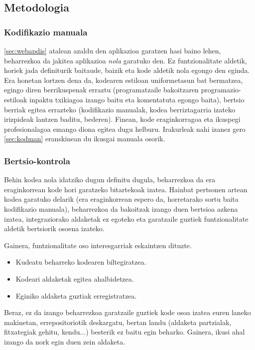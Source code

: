 \subsection{Metodologia}
\subsubsection{Kodifikazio manuala}
\ref{sec:webapdis} atalean azaldu den aplikazioa garatzen hasi baino lehen, beharrezkoa da jakitea aplikazioa \textit{nola} garatuko den. Ez funtzionalitate aldetik, horiek jada definiturik baitaude, baizik eta kode aldetik nola egongo den eginda. Era honetan lortzen dena da, kodearen estiloan uniformetasun bat bermatzea, egingo diren berrikuspenak erraztu (programatzaile bakoitzaren programazio-estiloak inpaktu txikiagoa izango baitu eta komentatuta egongo baita), bertsio berriak egitea errazteko (kodifikazio manualak, kodea berriztagarria izateko irizpideak lantzen baditu, bederen). Finean, kode eraginkorragoa eta ikuspegi profesionalagoa emango diona egitea dugu helburu. Irakurleak nahi izanez gero \ref{sec:kodman} eranskinean du ikusgai manuala osorik.

\subsubsection{Bertsio-kontrola}
Behin kodea nola idatziko dugun definitu dugula, beharrezkoa da era eraginkorrean kode hori garatzeko bitartekoak izatea. Hainbat pertsonen artean kodea garatuko delarik (era eraginkorrean espero da, horretarako sortu baita kodifikazio manuala), beharrezkoa da bakoitzak izango duen bertsioa azkena izatea, integraziorako aldaketak ez egoteko eta garatzaile guztiek funtzionalitate aldetik bertsiorik osoena izateko. 

Gainera, funtzionalitate oso interesgarriak eskaintzen dituzte.

\begin{itemize}
 \item Kudeatu beharreko kodearen biltegiratzea.
 \item Kodeari aldaketak egitea ahalbidetzea.
 \item Eginiko aldaketa guztiak erregistratzea.
\end{itemize}

Beraz, ez da izango beharrezkoa garatzaile guztiek kode osoa izatea euren laneko makinetan, errepositoriotik deskargatu, bertan landu (aldaketa partzialak, fitxategiak gehitu, kendu...) besterik ez baitu egin beharko.  Gainera, ikusi ahal izango da nork egin duen zein aldaketa.

